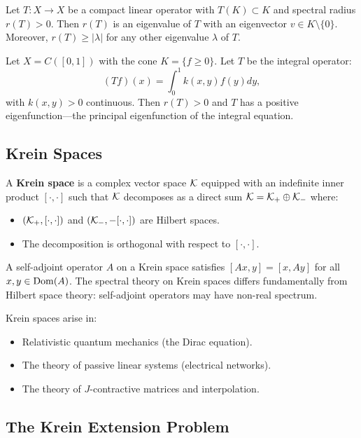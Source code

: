\begin{theorem}
Let $T: X \to X$ be a compact linear operator with $T(K) \subset K$ and spectral radius $r(T) > 0$. Then $r(T)$ is an eigenvalue of $T$ with an eigenvector $v \in K \setminus \{0\}$. Moreover, $r(T) \geq |\lambda|$ for any other eigenvalue $\lambda$ of $T$.
\end{theorem}

\begin{example}
Let $X = C([0,1])$ with the cone $K = \{f \geq 0\}$. Let $T$ be the integral operator:
\[
(Tf)(x) = \int_0^1 k(x,y) f(y) dy,
\]
with $k(x,y) > 0$ continuous. Then $r(T) > 0$ and $T$ has a positive eigenfunction---the principal eigenfunction of the integral equation.
\end{example}

\subsection{Krein Spaces}

\begin{definition}
A \textbf{Krein space} is a complex vector space $\mathcal{K}$ equipped with an indefinite inner product $[\cdot,\cdot]$ such that $\mathcal{K}$ decomposes as a direct sum $\mathcal{K} = \mathcal{K}_+ \oplus \mathcal{K}_-$ where:
\begin{itemize}
    \item $(\mathcal{K}_+, [\cdot,\cdot])$ and $(\mathcal{K}_-, -[\cdot,\cdot])$ are Hilbert spaces.
    \item The decomposition is orthogonal with respect to $[\cdot,\cdot]$.
\end{itemize}
\end{definition}

A self-adjoint operator $A$ on a Krein space satisfies $[Ax, y] = [x, Ay]$ for all $x, y \in \operatorname{Dom}(A)$. The spectral theory on Krein spaces differs fundamentally from Hilbert space theory: self-adjoint operators may have non-real spectrum.

Krein spaces arise in:
\begin{itemize}
    \item Relativistic quantum mechanics (the Dirac equation).
    \item The theory of passive linear systems (electrical networks).
    \item The theory of $J$-contractive matrices and interpolation.
\end{itemize}

\subsection{The Krein Extension Problem}

